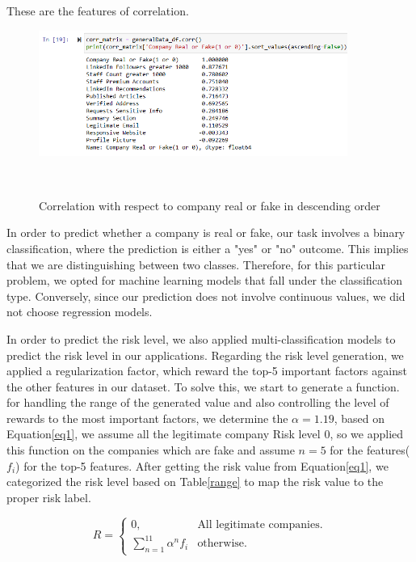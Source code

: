 \documentclass{article}
\begin{document}
These are the features of correlation.
\begin{figure}[h]%
\centering
\includegraphics[width=0.9\textwidth]{corr_matrix.png}


\caption{Correlation with respect to company real or fake in descending order}\ \label{corel1}
\end{figure}


In order to predict whether a company is real or fake, our task involves a binary classification, where the prediction is either a "yes" or "no" outcome. This implies that we are distinguishing between two classes. Therefore, for this particular problem, we opted for machine learning models that fall under the classification type. Conversely, since our prediction does not involve continuous values, we did not choose regression models.

In order to predict the risk level, we also applied multi-classification models to predict the risk level in our applications. Regarding the risk level generation, we applied a regularization factor, which reward the top-5 important factors against the other features in our dataset. To solve this, we start to generate a function. for handling the range of the generated value and also controlling the level of rewards to the most important factors, we determine the $\alpha = 1.19$, based on Equation\ref{eq1}, we assume all the legitimate company Risk level 0, so we applied this function on the companies which are fake and assume $n=5 $ for the features($f_i$) for the top-5 features. After getting the risk value from Equation\ref{eq1}, we categorized the risk level based on Table\ref{range} to map the risk value to the proper risk label.

\begin{center}
    \begin{equation}   \label{eq1} 
  R=\left\{
    \begin{array}{ll}
       0, & \mbox{All legitimate companies}.\\
      \sum_{n=1}^{11} \alpha^n f_i 
& \mbox{otherwise}.  
    \end{array}
  \right. 
\end{equation}

\end{center}
\end{document}
